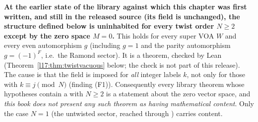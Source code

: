 \begin{warning}[title={Read this before the definition: for $N\ge2$ the only twisted super module is $M=0$}]
\textbf{At the earlier state of the library against which this chapter was first written, and still in the
released source (its  field is unchanged), the structure 
defined below is uninhabited for every twist order $N\ge2$ except by the zero space $M=0$.} This
holds for every super VOA $W$ and every even automorphism $g$ (including $g=1$ and the parity
automorphism $g=(-1)^F$, i.e.\ the Ramond sector). It is a theorem, checked by Lean
(Theorem~\ref{l17:thm:twistvacuous} below; the check is not part of this release). The cause is that the  field is imposed for
\emph{all} integer labels $k$, not only for those with $k\equiv j\pmod N$ (finding (F1)).
Consequently every library theorem whose hypotheses contain a  with
$N\ge2$ is a statement about the zero vector space, and \emph{this book does not present any such
theorem as having mathematical content}. Only the case $N=1$ (the untwisted sector, reached through
) carries content.
\end{warning}

